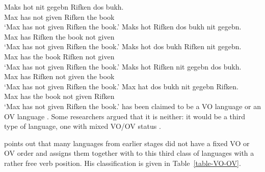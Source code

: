 \eal
\label{ex-yiddish-vo-ov}
\ex
\gll Maks hot nit gegebn Rifken dos bukh.\\
     Max  has not given  Rifken the book\\\yiddish
\glt `Max has not given Rifken the book.' 
\ex 
\gll Maks hot Rifken dos bukh nit gegebn.\\
     Max  has Rifken the book not given\\
\glt `Max has not given Rifken the book.'
\ex
\gll Maks hot dos bukh Rifken nit gegebn.\\
     Max  has the book Rifken not given\\
\glt `Max has not given Rifken the book.'
\ex
\gll Maks hot Rifken nit gegebn dos bukh.\\
     Max  has Rifken not given  the book\\
\glt `Max has not given Rifken the book.'
\ex
\glt Max hat dos bukh nit gegebn Rifken.\\
     Max has the book not given  Rifken\\
\glt `Max has not given Rifken the book.'
\zl
{} has been claimed to be a VO language
\parencites[]{dBMvW86a}[]{Diesing97a}{Sadock98a} or an OV
language \parencites{Hall79a}{Geilfuss90a-u}[Chapter~2]{Vikner2001a}. Some researchers argued that it is
neither: it would be a third type of language, one with mixed VO/OV status \parencites{Santorini93a}[]{Schallert2007a}[]{Haider2010a}{Haider2020a}.

\citet[Section~2.5]{Schallert2007a} points out that many  languages from earlier stages did not have a
fixed VO or OV order and assigns them together with  to this third class of languages with a
rather free verb position. His classification is given in Table~\ref{table-VO-OV}.
 
\begin{table}
\caption{Constituent order typology of the Germanic languages according to \citet[]{Schallert2007a}}\label{table-VO-OV}
\end{table}

